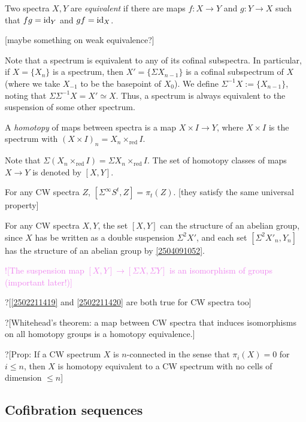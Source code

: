 \documentclass{MetricNotes2023}
\def\id{\ensuremath\text{id}}
\def\textcolour{\textcolor}
\begin{document}
\begin{definition}
Two spectra \(X, Y\) are \textit{equivalent} if there are maps \(f : X \to Y\) and \(g : Y \to X\) such that \(fg=\id_{Y}\) and \(gf=\id_X\).
\end{definition}

[maybe something on weak equivalence?]

Note that a spectrum is equivalent to any of its cofinal subspectra. In particular, if \(X=\{X_n\}\) is a spectrum, then \(X'=\{\Sigma X_{n-1}\}\) is a cofinal subspectrum of \(X\) (where we take \(X_{-1}\) to be the basepoint of \(X_0\)). We define \(\Sigma^{-1}X:=\{X_{n-1}\}\), noting that \(\Sigma \Sigma^{-1}X=X'\simeq X\). Thus, a spectrum is always equivalent to the suspension of some other spectrum.

\begin{definition}
A \textit{homotopy} of maps between spectra is a map \(X\times I \to Y\), where \(X\times I\) is the spectrum with \((X\times I)_n=X_n\times_{\text{red}} I\).
\end{definition}

Note that \(\Sigma(X_n\times_{\text{red}}I)=\Sigma X_n\times_{\text{red}}I\). The set of homotopy classes of maps \(X\to Y\) is denoted by \([X,Y]\). 

\begin{remark}
For any CW spectra \(Z\), \([\Sigma^\infty S^t, Z]=\pi_t(Z)\). [they satisfy the same universal property]
\end{remark}

For any CW spectra \(X,Y\), the set \([X,Y]\) can the structure of an abelian group, since \(X\) has be written as a double suspension \(\Sigma^2X'\), and each set \([\Sigma^2X'_n, Y_n]\) has the structure of an abelian group by \ref{2504091052}. 

\textcolour{violet}{![The suspension map \([X,Y]\to[\Sigma X, \Sigma Y]\) is an isomorphism of groups (important later!)]}

?[\ref{2502211419} and \ref{2502211420} are both true for CW spectra too]

?[Whitehead's theorem: a map between CW spectra that induces isomorphisms on all homotopy groups is a homotopy equivalence.]

?[Prop: If a CW spectrum \(X\) is \(n\)-connected in the sense that \(\pi_i(X)=0\) for \(i\leq n\), then \(X\) is homotopy equivalent to a CW spectrum with no cells of dimension \(\leq n\)]

\subsection{Cofibration sequences}\label{2503291211}
\end{document}
